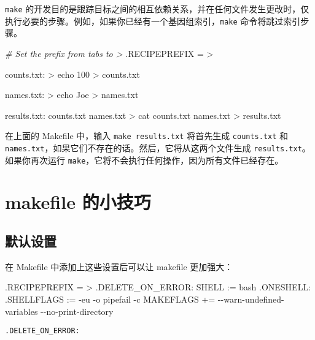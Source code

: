 \documentclass[]{ctexbook}
\newenvironment{Shaded}{\begin{snugshade}}{\end{snugshade}}
\newcommand{\CharTok}[1]{\textcolor[rgb]{0.31,0.60,0.02}{#1}}
\newcommand{\CommentTok}[1]{\textcolor[rgb]{0.56,0.35,0.01}{\textit{#1}}}
\newcommand{\DataTypeTok}[1]{\textcolor[rgb]{0.13,0.29,0.53}{#1}}
\newcommand{\DecValTok}[1]{\textcolor[rgb]{0.00,0.00,0.81}{#1}}
\newcommand{\NormalTok}[1]{#1}
\newcommand{\OtherTok}[1]{\textcolor[rgb]{0.56,0.35,0.01}{#1}}
\newcommand{\StringTok}[1]{\textcolor[rgb]{0.31,0.60,0.02}{#1}}
\begin{document}
\texttt{make} 的开发目的是跟踪目标之间的相互依赖关系，并在任何文件发生更改时，仅执行必要的步骤。例如，如果你已经有一个基因组索引，\texttt{make} 命令将跳过索引步骤。

\begin{Shaded}
\begin{Highlighting}[]
\CommentTok{\# Set the prefix from tabs to \textgreater{}}
\DataTypeTok{.RECIPEPREFIX} \CharTok{=}\StringTok{ \textgreater{}}

\DecValTok{counts.txt:}
\NormalTok{\textgreater{} echo 100 \textgreater{} counts.txt}

\DecValTok{names.txt:}
\NormalTok{\textgreater{} echo Joe \textgreater{} names.txt}

\DecValTok{results.txt:}\DataTypeTok{ counts.txt names.txt}
\NormalTok{\textgreater{} cat counts.txt names.txt \textgreater{} results.txt}
\end{Highlighting}
\end{Shaded}

在上面的 Makefile 中，输入 \texttt{make\ results.txt} 将首先生成 \texttt{counts.txt} 和 \texttt{names.txt}，如果它们不存在的话。然后，它将从这两个文件生成 \texttt{results.txt}。如果你再次运行 \texttt{make}，它将不会执行任何操作，因为所有文件已经存在。

\section{makefile 的小技巧}\label{makefile-ux7684ux5c0fux6280ux5de7}

\subsection{默认设置}\label{ux9ed8ux8ba4ux8bbeux7f6e}

在 Makefile 中添加上这些设置后可以让 makefile 更加强大：

\begin{Shaded}
\begin{Highlighting}[]
\DataTypeTok{.RECIPEPREFIX} \CharTok{=}\StringTok{ \textgreater{}}
\OtherTok{.DELETE\_ON\_ERROR:}
\DataTypeTok{SHELL} \CharTok{:=}\StringTok{ bash}
\OtherTok{.ONESHELL:}
\DataTypeTok{.SHELLFLAGS} \CharTok{:=}\StringTok{ {-}eu {-}o pipefail {-}c}
\DataTypeTok{MAKEFLAGS} \CharTok{+=}\StringTok{ {-}{-}warn{-}undefined{-}variables {-}{-}no{-}print{-}directory}
\end{Highlighting}
\end{Shaded}

\texttt{.DELETE\_ON\_ERROR:}
\end{document}
